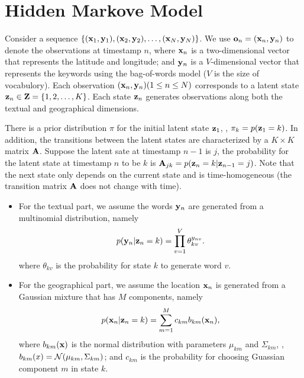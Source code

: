 
\section{Hidden Markove Model}


Consider a sequence $\{(\mathbf{x}_1, \mathbf{y}_1), (\mathbf{x}_2, \mathbf{y}_2), \ldots, (\mathbf{x}_N, \mathbf{y}_N)\}$. We
use $\mathbf{o}_n = (\mathbf{x}_n, \mathbf{y}_n)$ to denote the observations at timestamp $n$, where
$\mathbf{x}_n$ is a two-dimensional vector that represents the latitude and longitude;
and $\mathbf{y}_n$ is a $V$-dimensional vector that represents the keywords using the
bag-of-words model ($V$ is the size of vocabulory).  Each observation $(\mathbf{x}_n,
\mathbf{y}_n) (1 \le n \le N)$ corresponds to a latent state $\mathbf{z}_n \in \mathbf{Z} = \{1, 2,
\ldots, K\}$.  Each state $\mathbf{z}_n$ generates observations along both the textual
and geographical dimensions. 

 There is a prior distribution $\pi$ for the initial
latent state $\mathbf{z}_1$, \ie, $\pi_k = p(\mathbf{z}_1 = k)$. In addition, the transitions
between the latent states are characterized by a $K \times K$ matrix $\mathbf{A}$.
Suppose the latent sate at timestamp $n-1$ is $j$, the probability for the
latent state at timestamp $n$ to be $k$ is $\mathbf{A}_{jk} = p(\mathbf{z}_n = k | \mathbf{z}_{n-1} =
j)$. Note that the next state only depends on the current state  and is
time-homogeneous (the transition matrix $\mathbf{A}$ does not change with time).

\begin{itemize}
  \item
    For the textual part, we assume the words $\mathbf{y}_n$ are generated from a
    multinomial distribution, namely
    $$
    p(\mathbf{y}_n | \mathbf{z}_n = k) = \prod\limits_{v=1}^V \theta_{kv}^{y_{nv}}.
    $$
    where $\theta_{kv}$ is the probability for state $k$ to generate word $v$.

  \item
    For the geographical part, we assume the location $\mathbf{x}_n$ is generated from a Gaussian mixture
    that has $M$ components, namely
    $$
    p(\mathbf{x}_n | \mathbf{z}_n = k) = \sum\limits_{m=1}^M c_{km} b_{km}(\mathbf{x}_n),
    $$
    where $b_{km}(\mathbf{x})$ is the normal distribution with parameters $\mu_{km}$ and $\Sigma_{km}$, \ie,
    $b_{km}(x) = \mathcal{N}(\mu_{km}, \Sigma_{km})$; and $c_{km}$ is the probability for choosing Guassian 
    component $m$ in state $k$.

\end{itemize}

